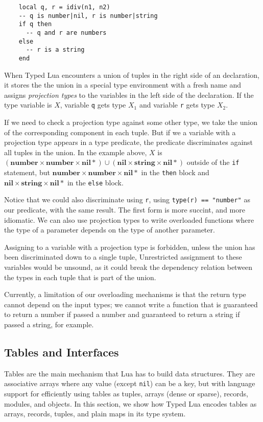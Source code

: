 \documentclass[preprint]{sig-alternate}
\newcommand{\Nil}{\mathbf{nil}}
\newcommand{\Number}{\mathbf{number}}
\newcommand{\String}{\mathbf{string}}
\begin{document}
\begin{verbatim}
    local q, r = idiv(n1, n2)
    -- q is number|nil, r is number|string
    if q then
      -- q and r are numbers
    else
      -- r is a string
    end
\end{verbatim}

When Typed Lua encounters a union of tuples in the right side
of an declaration, it stores the the union in a special type
environment with a fresh name and assigns {\em projection types} 
to the variables in the left side of the declaration. If the type
variable is $X$, variable {\tt q} gets type $X_1$ and variable
{\tt r} gets type $X_2$.

If we need to check a projection type
against some other type, we take the union of the corresponding
component in each tuple. But if we a variable with a projection
type appears in a type predicate, the predicate discriminates
against all tuples in the union. In the example above,
$X$ is $(\Number \times \Number \times \Nil *) \cup
(\Nil \times \String \times \Nil *)$ outside of the {\tt if}
statement, but $\Number \times \Number \times \Nil *$ in the
{\tt then} block and $\Nil \times \String \times \Nil *$ in
the {\tt else} block.

Notice that we could also discriminate using {\tt r}, using
{\tt type(r) == "number"} as our predicate, with the same
result. The first form is more succint, and more idiomatic.
We can also use projection types to write overloaded functions
where the type of a parameter depends on the type of another
parameter.

Assigning to a variable with a projection type is forbidden,
unless the union has been discriminated down to a single tuple,
Unrestricted assignment to these variables would be unsound,
as it could break the dependency relation between the types
in each tuple that is part of the union.

Currently, a limitation of our overloading mechanisms is that
the return type cannot depend on the input types; we cannot
write a function that is guaranteed to return a number if
passed a number and guaranteed to return a string if passed
a string, for example.

\subsection{Tables and Interfaces}

Tables are the main mechanism that Lua has to build data
structures. They are associative arrays where any value
(except {\tt nil}) can be a key, but with language support
for efficiently using tables as tuples, arrays (dense or sparse),
records, modules, and objects. In this section,
we show how Typed Lua encodes tables as arrays, records, tuples,
and plain maps in its type system.
\end{document}
